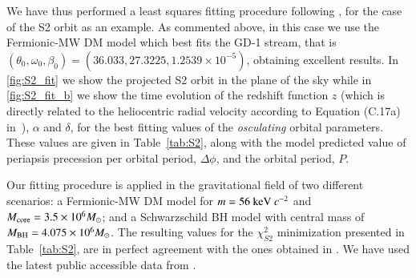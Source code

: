 \documentclass[twocolumn]{aa}
\begin{document}
We have thus performed a least squares fitting procedure following \cite{2020A&A...641A..34B}, for the case of the S2 orbit as an example. As commented above, in this case we use the Fermionic-MW DM model which best fits the GD-1 stream, that is $(\theta_0, \omega_0, \beta_0)= (36.033, 27.3225, 1.2539\times10^{-5})$, obtaining excellent results. In \cref{fig:S2_fit}  we show the projected S2 orbit in the plane of the sky while in \cref{fig:S2_fit_b} we show the time evolution of the redshift function $z$ (which is directly related to the heliocentric radial velocity according to Equation (C.17a) in~\citealp{2020A&A...641A..34B}), $\alpha$ and $\delta$, for the best fitting values of the \textit{osculating} orbital parameters. These values are given in Table~\ref{tab:S2}, along with the model predicted value of periapsis precession per orbital period, $\Delta \phi$, and the orbital period, $P$.

Our fitting procedure is applied in the gravitational field of two different scenarios: a Fermionic-MW DM model for $m=56~{\rm keV}~c^{-2}$ and $M_{\rm{core}}=3.5\times 10^6 M_\odot$; and a Schwarzschild BH model with central mass of $M_{\rm BH}=4.075\times 10^6 M_\odot$.
The resulting values for the $\chi^2_{S2}$ minimization presented in Table~\ref{tab:S2}, are in perfect agreement with the ones obtained in \cite{2020A&A...641A..34B}.
We have used the latest public accessible data from \cite{2019Sci...365..664D}.
\end{document}
